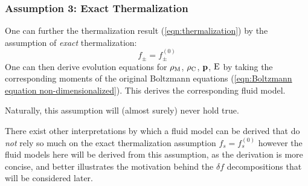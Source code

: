 \subsubsection*{Assumption 3: Exact Thermalization}
    One can further the thermalization result (\ref{eqn:thermalization}) by the assumption of \emph{exact} thermalization:
    \begin{equation}
      f_{\pm}  =  f_{\pm}^{(0)}
    \end{equation}
    One can then derive evolution equations for $\rho_{\mathrm{M}}$, $\rho_{\mathrm{C}}$, $\mathbf{p}$, $\mathrm{E}$ by taking the corresponding moments of the original Boltzmann equations (\ref{eqn:Boltzmann equation non-dimensionalized}). This derives the corresponding fluid model.

    \begin{remark}
        Naturally, this assumption will (almost surely) never hold true.
        
        There exist other interpretations by which a fluid model can be derived that do \emph{not} rely so much on the exact thermalization assumption $f_{s}  =  f_{s}^{(0)}$  however the fluid models here will be derived from this assumption, as the derivation is more concise, and better illustrates the motivation behind the $\delta\!f$ decompositions that will be considered later. 
    \end{remark}

